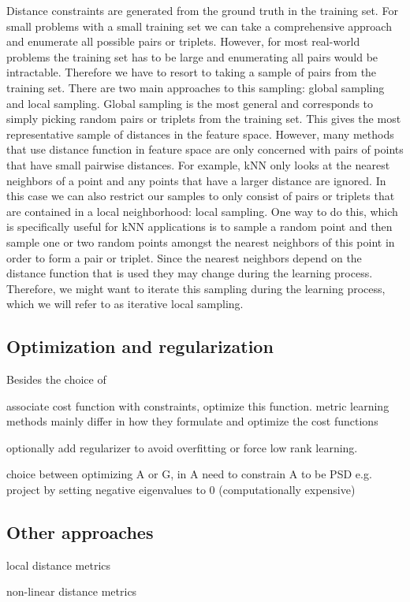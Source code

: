 Distance constraints are generated from the ground truth in the training set. For small problems with a small training set we can take a comprehensive approach and enumerate all possible pairs or triplets. However, for most real-world problems the training set has to be large and enumerating all pairs would be intractable. Therefore we have to resort to taking a sample of pairs from the training set. There are two main approaches to this sampling: global sampling and local sampling. Global sampling is the most general and corresponds to simply picking random pairs or triplets from the training set. This gives the most representative sample of distances in the feature space. However, many methods that use distance function in feature space are only concerned with pairs of points that have small pairwise distances. For example, \ac{kNN} only looks at the nearest neighbors of a point and any points that have a larger distance are ignored. In this case we can also restrict our samples to only consist of pairs or triplets that are contained in a local neighborhood: local sampling. One way to do this, which is specifically useful for \ac{kNN} applications is to sample a random point and then sample one or two random points amongst the nearest neighbors of this point in order to form a pair or triplet. Since the nearest neighbors depend on the distance function that is used they may change during the learning process. Therefore, we might want to iterate this sampling during the learning process, which we will refer to as iterative local sampling.



\subsection{Optimization and regularization}

Besides the choice of

associate cost function with constraints, optimize this function. metric learning methods mainly differ in how they formulate and optimize the cost functions

optionally add regularizer to avoid overfitting or force low rank learning.

choice between optimizing A or G, in A need to constrain A to be PSD e.g. project by setting negative eigenvalues to 0 (computationally expensive)



\subsection{Other approaches}

local distance metrics

non-linear distance metrics






